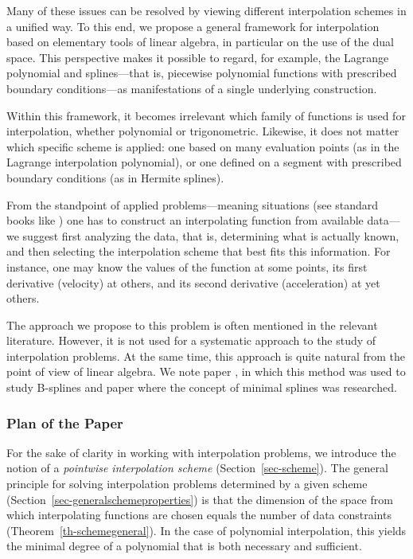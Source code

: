 \documentclass{article}
\theoremstyle{definition}
\theoremstyle{definition}
\numberwithin{figure}{section}
\newcommand{\1}{\mathbf{1}}
\begin{document}
Many of these issues can be resolved by viewing different interpolation schemes in a unified way. To this end, we propose a general framework for interpolation based on elementary tools of linear algebra, in particular on the use of the dual space. This perspective makes it possible to regard, for example, the Lagrange polynomial and splines—that is, piecewise polynomial functions with prescribed boundary conditions—as manifestations of a single underlying construction.

Within this framework, it becomes irrelevant which family of functions is used for interpolation, whether polynomial or trigonometric. Likewise, it does not matter which specific scheme is applied: one based on many evaluation points (as in the Lagrange interpolation polynomial), or one defined on a segment with prescribed boundary conditions (as in Hermite splines).

From the standpoint of applied problems—meaning situations (see standard books like \cite{Boor,Schumaker_2007}) one has to construct an interpolating function from available data—we suggest first analyzing the data, that is, determining what is actually known, and then selecting the interpolation scheme that best fits this information. For instance, one may know the values of the function at some points, its first derivative (velocity) at others, and its second derivative (acceleration) at yet others.

The approach we propose to this problem is often mentioned in the relevant literature. However, it is not used for a systematic approach to the study of interpolation problems. At the same time, this approach is quite natural from the point of view of linear algebra. We note paper \cite{Makarov2017-gm}, in which this method was used to study B-splines and paper \cite{Livshits2024-sz} where the concept of minimal splines was researched.



\subsubsection*{Plan of the Paper}

For the sake of clarity in working with interpolation problems, we introduce the notion of a \emph{pointwise interpolation scheme} (Section~\ref{sec-scheme}). The general principle for solving interpolation problems determined by a given scheme (Section~\ref{sec-generalschemeproperties}) is that the dimension of the space from which interpolating functions are chosen equals the number of data constraints (Theorem~\ref{th-schemegeneral}). In the case of polynomial interpolation, this yields the minimal degree of a polynomial that is both necessary and sufficient.
\end{document}

